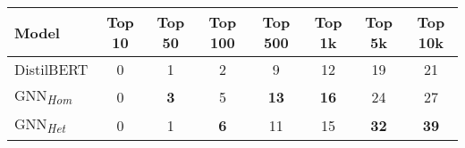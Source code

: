 \begin{tabular}{lccccccc}
\toprule
Model                         & Top 10 & Top 50     & Top 100    & Top 500     & Top 1k      & Top 5k      & Top 10k \\
\midrule
DistilBERT                    & 0      & 1          & 2          & 9           & 12          & 19          & 21          \\
GNN\textsubscript{\emph{Hom}} & 0      & \textbf{3} & 5          & \textbf{13} & \textbf{16} & 24          & 27          \\
GNN\textsubscript{\emph{Het}} & 0      & 1          & \textbf{6} & 11          & 15          & \textbf{32} & \textbf{39} \\
\bottomrule
\end{tabular}
